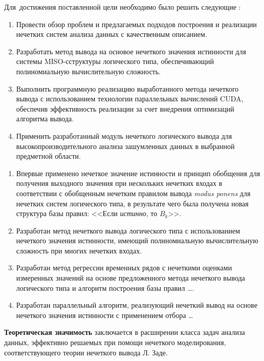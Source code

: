 Для~достижения поставленной цели необходимо было решить следующие {\tasks}:
\begin{enumerate}[beginpenalty=10000] %
  \item Провести обзор проблем и предлагаемых подходов построения и реализации нечетких систем анализа данных с качественным описанием.
  \item Разработать метод вывода на основое нечеткого значения истинности для системы MISO-сструктуры логического типа, обеспечивающий полиномиальную вычислительную сложность.
  \item Выполнить программную реализацию выработанного метода нечеткого вывода с использованием технологии параллельных вычислений CUDA, обеспечив эффективность реализации за счет внедрения оптимизаций алгоритма вывода.
  \item Применить разработанный модуль нечеткого логического вывода для высокопроизводительного анализа зашумленных данных в выбранной предметной области.
\end{enumerate}


{\novelty}
\begin{enumerate}[beginpenalty=10000] %
  \item Впервые применено нечеткое значение истинности и принцип обобщения для получения выходного значения при нескольких нечетких входах в соответствии с обобщенным нечетким правилом вывода \textit{modus ponens} для нечетких систем логического типа, в результате чего была получена новая структура базы правил: <<Если \textit{истинно}, то $B_k$>>.
  \item Разработан метод нечеткого вывода логического типа с использованием нечеткого значения истинности, имеющий полиномиальную вычислительную сложность при многих нечетких входах.
  \item Разработан метод регрессии временных рядов с нечеткими оценками измеренных значений на основе предложенного метода нечеткого вывода логического типа и алгоритм построения базы правил \dots.
  \item Разработан параллельный алгоритм, реализующий нечеткий вывод на основе нечеткого значения истинности с применением отбора \dots
\end{enumerate}

\textbf{Теоретическая значимость} заключается в расширении класса задач анализа данных, эффективно решаемых при помощи нечеткого моделирования, соответствующего теории нечеткого вывода Л. Заде.

